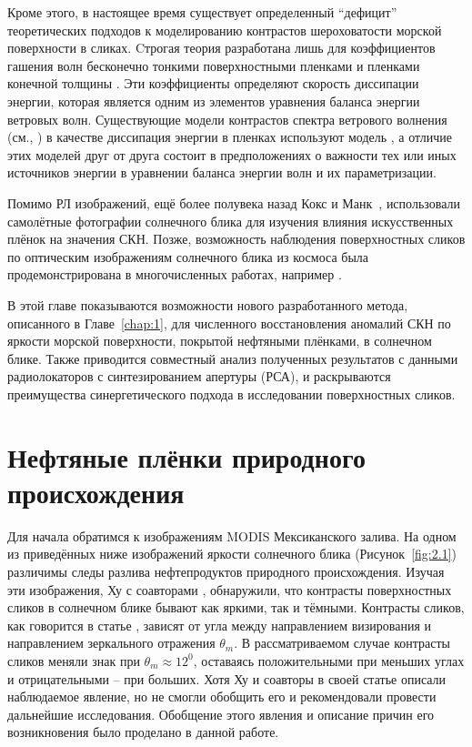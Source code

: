 Кроме этого, в настоящее время существует определенный ``дефицит'' теоретических подходов к моделированию контрастов шероховатости морской поверхности в сликах. Cтрогая теория разработана лишь для коэффициентов гашения волн бесконечно тонкими поверхностными пленками \citep{Levich1959} и пленками конечной толщины \citep{Jenkins1997}. Эти коэффициенты определяют скорость диссипации энергии, которая является одним из элементов уравнения баланса энергии ветровых волн. Существующие модели контрастов спектра ветрового волнения (см., \citep{Ermakov1987, Ermakov1992, Alpers1989, Gade1998}) в качестве диссипация энергии в пленках используют модель \citep{Levich1959}, а отличие этих моделей друг от друга состоит в предположениях о важности тех или иных источников энергии в уравнении баланса энергии волн и их параметризации.

Помимо РЛ изображений, ещё более полувека назад Кокс и Манк~\citep{Cox1954, Cox1954a}, использовали самолётные фотографии солнечного блика для изучения влияния искусственных плёнок на значения СКН. Позже, возможность наблюдения поверхностных сликов по оптическим изображениям солнечного блика из космоса была продемонстрирована в многочисленных работах, например \citep{Brekke2005, Chust2007, Hu2009}.

В этой главе показываются возможности нового разработанного метода, описанного в Главе~\ref{chap:1}, для численного восстановления аномалий СКН по яркости морской поверхности, покрытой нефтяными плёнками, в солнечном блике. Также приводится совместный анализ полученных результатов с данными радиолокаторов с синтезированием апертуры (РСА), и раскрываются преимущества синергетического подхода в исследовании поверхностных сликов.



\section{Нефтяные плёнки природного происхождения} \label{sec:2.1}

Для начала обратимся к изображениям MODIS Мексиканского залива. На одном из приведённых ниже изображений яркости солнечного блика (Рисунок~\ref{fig:2.1}) различимы следы разлива нефтепродуктов природного происхождения. Изучая эти изображения, Ху с соавторами \citep{Hu2009}, обнаружили, что контрасты поверхностных сликов в солнечном блике бывают как яркими, так и тёмными. Контрасты сликов, как говорится в статье \citep{Hu2009}, зависят от угла между направлением визирования и направлением зеркального отражения $\theta _{m} $. В рассматриваемом случае контрасты сликов меняли знак при $\theta _{m} \approx 12^{0} $, оставаясь положительными при меньших углах и отрицательными -- при больших. Хотя Ху и соавторы в своей статье \citep{Hu2009} описали наблюдаемое явление, но не смогли обобщить его и рекомендовали провести дальнейшие исследования. Обобщение этого явления и описание причин его возникновения было проделано в данной работе.

